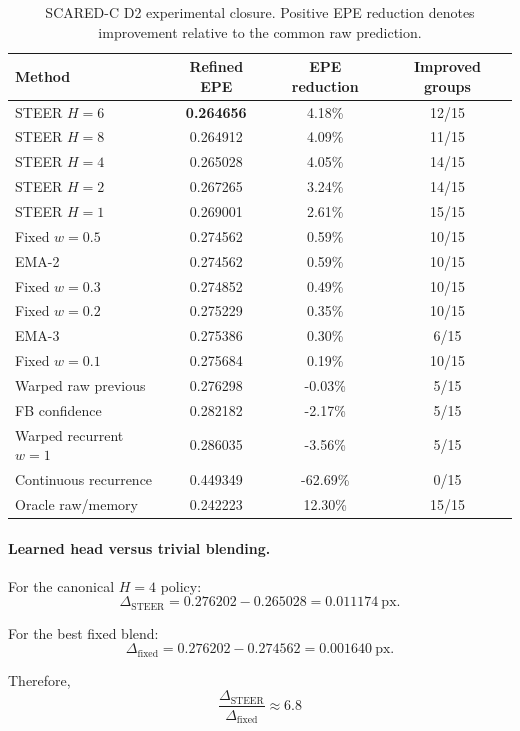 \documentclass[11pt,a4paper]{article}
\begin{document}
\begin{table}[h]
\centering
\small
\begin{tabular}{lccc}
\toprule
Method & Refined EPE & EPE reduction & Improved groups \\
\midrule
STEER $H=6$ & \textbf{0.264656} & 4.18\% & 12/15 \\
STEER $H=8$ & 0.264912 & 4.09\% & 11/15 \\
STEER $H=4$ & 0.265028 & 4.05\% & 14/15 \\
STEER $H=2$ & 0.267265 & 3.24\% & 14/15 \\
STEER $H=1$ & 0.269001 & 2.61\% & 15/15 \\
\midrule
Fixed $w=0.5$ & 0.274562 & 0.59\% & 10/15 \\
EMA-2 & 0.274562 & 0.59\% & 10/15 \\
Fixed $w=0.3$ & 0.274852 & 0.49\% & 10/15 \\
Fixed $w=0.2$ & 0.275229 & 0.35\% & 10/15 \\
EMA-3 & 0.275386 & 0.30\% & 6/15 \\
Fixed $w=0.1$ & 0.275684 & 0.19\% & 10/15 \\
Warped raw previous & 0.276298 & -0.03\% & 5/15 \\
FB confidence & 0.282182 & -2.17\% & 5/15 \\
Warped recurrent $w=1$ & 0.286035 & -3.56\% & 5/15 \\
Continuous recurrence & 0.449349 & -62.69\% & 0/15 \\
\midrule
Oracle raw/memory & 0.242223 & 12.30\% & 15/15 \\
\bottomrule
\end{tabular}
\caption{SCARED-C D2 experimental closure. Positive EPE reduction
denotes improvement relative to the common raw prediction.}
\end{table}

\paragraph{Learned head versus trivial blending.}

For the canonical $H=4$ policy:
\[
\Delta_{\mathrm{STEER}}
=
0.276202 - 0.265028
=
0.011174~\mathrm{px}.
\]

For the best fixed blend:
\[
\Delta_{\mathrm{fixed}}
=
0.276202 - 0.274562
=
0.001640~\mathrm{px}.
\]

Therefore,
\[
\boxed{
\frac{\Delta_{\mathrm{STEER}}}
{\Delta_{\mathrm{fixed}}}
\approx 6.8
}
\]
\end{document}
